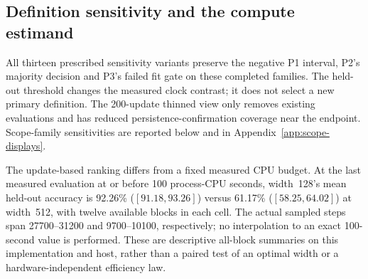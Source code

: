 \subsection{Definition sensitivity and the compute estimand}
All thirteen prescribed sensitivity variants preserve the negative P1 interval, P2's majority decision and P3's failed fit gate on these completed families. The held-out threshold changes the measured clock contrast; it does not select a new primary definition. The 200-update thinned view only removes existing evaluations and has reduced persistence-confirmation coverage near the endpoint. Scope-family sensitivities are reported below and in Appendix~\ref{app:scope-displays}.

The update-based ranking differs from a fixed measured CPU budget. At the last measured evaluation at or before 100 process-CPU seconds, width~128's mean held-out accuracy is 92.26\% ($[91.18,93.26]$) versus 61.17\% ($[58.25,64.02]$) at width~512, with twelve available blocks in each cell. The actual sampled steps span 27700--31200 and 9700--10100, respectively; no interpolation to an exact 100-second value is performed. These are descriptive all-block summaries on this implementation and host, rather than a paired test of an optimal width or a hardware-independent efficiency law.
